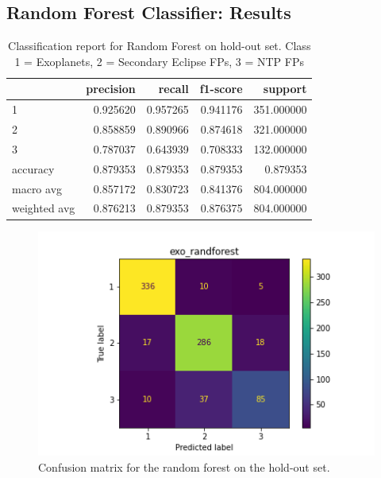 \documentclass{article}
\begin{document}
\subsection{Random Forest Classifier: Results}
\begin{table}[H]
	\begin{center}
\begin{tabular}{l|r|r|r|r}
	
	{} &  precision &    recall &  f1-score &     support \\ \hline
	
	1            &   0.925620 &  0.957265 &  0.941176 &  351.000000 \\ \hline
	2            &   0.858859 &  0.890966 &  0.874618 &  321.000000 \\ \hline
	3            &   0.787037 &  0.643939 &  0.708333 &  132.000000 \\ \hline
	accuracy     &   0.879353 &  0.879353 &  0.879353 &    0.879353 \\ \hline
	macro avg    &   0.857172 &  0.830723 &  0.841376 &  804.000000 \\ \hline
	weighted avg &   0.876213 &  0.879353 &  0.876375 &  804.000000 \\ \hline
	
\end{tabular}
	\end{center}
	\caption{Classification report for Random Forest on hold-out set. Class 1 = Exoplanets, 2 = Secondary Eclipse FPs, 3 = NTP FPs}
\end{table}
  \begin{figure}[H]
	\begin{center}
		\includegraphics[totalheight=6cm]{figures/exo_randforest_cfmat.png}
	\end{center}
	\caption{Confusion matrix for the random forest on the hold-out set.}
\end{figure}
\end{document}
